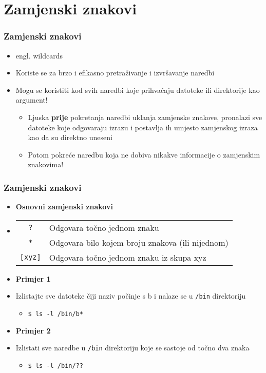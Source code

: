 \documentclass{beamer}
\newcommand{\shell}[1]{\texttt{#1}}
\begin{document}
\section{Zamjenski znakovi}
\begin{frame}[t]
\frametitle{Zamjenski znakovi}
\begin{itemize}
  \item engl. wildcards
  \item Koriste se za brzo i efikasno pretraživanje i izvršavanje naredbi
\end{itemize}
\begin{itemize}
	\item Mogu se koristiti kod svih naredbi koje 
	prihvaćaju datoteke ili direktorije kao argument!
	\begin{itemize}
		\item Ljuska \textbf{prije} pokretanja naredbi uklanja zamjenske znakove, pronalazi sve datoteke koje odgovaraju izrazu i postavlja ih umjesto zamjenskog izraza kao da su direktno uneseni
		\item Potom pokreće naredbu koja ne dobiva nikakve informacije o zamjenskim znakovima!
	\end{itemize}
\end{itemize}
\end{frame}

\begin{frame}[t]
\frametitle{Zamjenski znakovi}
\begin{itemize}
	\item[] \textbf{Osnovni zamjenski znakovi}
	\item[] \begin{tabular}{c l}
		\shell{?}   & Odgovara točno jednom znaku\\
		\shell{*}   & Odgovara bilo kojem broju znakova (ili nijednom)\\
		\shell{[xyz]}  & Odgovara točno jednom znaku iz skupa xyz
	\end{tabular}
\end{itemize}
\vfill
\begin{itemize}
	\item \textbf{Primjer 1}
	\item[] Izlistajte sve datoteke čiji naziv počinje s b i nalaze se u \shell{/bin} direktoriju
	\begin{itemize}
		\item[] \shell{\$ ls -l /bin/b*}
	\end{itemize}
\end{itemize}
\vfill
\begin{itemize}
	\item \textbf{Primjer 2}
	\item[] Izlistati sve naredbe u \shell{/bin} direktoriju koje se sastoje od točno dva znaka
	\begin{itemize}
		\item[] \shell{\$ ls -l /bin/??}
	\end{itemize}
\end{itemize}
\end{frame}
\end{document}
